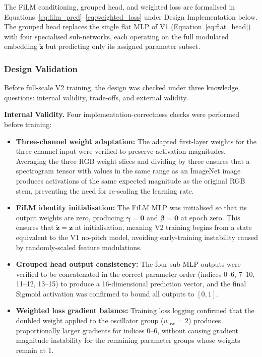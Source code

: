 \noindent
The FiLM conditioning, grouped head, and weighted loss are formalised in Equations~\ref{eq:film_pred}--\ref{eq:weighted_loss} under Design Implementation below. The grouped head replaces the single flat MLP of V1 (Equation~\ref{eq:flat_head}) with four specialised sub-networks, each operating on the full modulated embedding $\tilde{\mathbf{z}}$ but predicting only its assigned parameter subset.

\subsubsection{Design Validation}

\noindent
Before full-scale V2 training, the design was checked under three knowledge questions: internal validity, trade-offs, and external validity.

\par \vspace{0.3cm}
\noindent\textbf{Internal Validity.} Four implementation-correctness checks were performed before training:
\begin{itemize}
    \item \textbf{Three-channel weight adaptation:} The adapted first-layer weights for the three-channel input were verified to preserve activation magnitudes. Averaging the three RGB weight slices and dividing by three ensures that a spectrogram tensor with values in the same range as an ImageNet image produces activations of the same expected magnitude as the original RGB stem, preventing the need for re-scaling the learning rate.

    \item \textbf{FiLM identity initialisation:} The FiLM MLP was initialised so that its output weights are zero, producing $\boldsymbol{\gamma}=\mathbf{0}$ and $\boldsymbol{\beta}=\mathbf{0}$ at epoch zero. This ensures that $\tilde{\mathbf{z}} = \mathbf{z}$ at initialisation, meaning V2 training begins from a state equivalent to the V1 no-pitch model, avoiding early-training instability caused by randomly-scaled feature modulations.

    \item \textbf{Grouped head output consistency:} The four sub-MLP outputs were verified to be concatenated in the correct parameter order (indices 0–6, 7–10, 11–12, 13–15) to produce a 16-dimensional prediction vector, and the final Sigmoid activation was confirmed to bound all outputs to $[0,1]$.

    \item \textbf{Weighted loss gradient balance:} Training loss logging confirmed that the doubled weight applied to the oscillator group ($w_{\text{osc}}=2$) produces proportionally larger gradients for indices 0–6, without causing gradient magnitude instability for the remaining parameter groups whose weights remain at 1.
\end{itemize}

